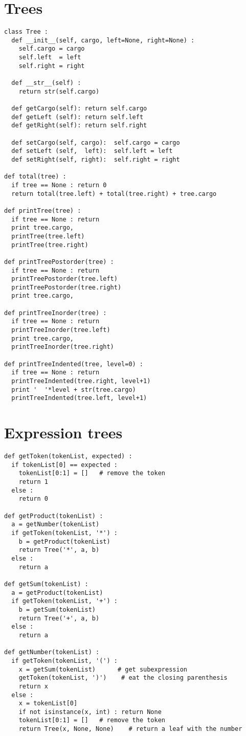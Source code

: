 \section{Trees}
\beforeverb
\begin{verbatim}
class Tree :
  def __init__(self, cargo, left=None, right=None) :
    self.cargo = cargo
    self.left  = left
    self.right = right

  def __str__(self) :
    return str(self.cargo)

  def getCargo(self): return self.cargo
  def getLeft (self): return self.left
  def getRight(self): return self.right

  def setCargo(self, cargo):  self.cargo = cargo
  def setLeft (self,  left):  self.left = left
  def setRight(self, right):  self.right = right

def total(tree) :
  if tree == None : return 0
  return total(tree.left) + total(tree.right) + tree.cargo

def printTree(tree) :
  if tree == None : return
  print tree.cargo,
  printTree(tree.left)
  printTree(tree.right)

def printTreePostorder(tree) :
  if tree == None : return
  printTreePostorder(tree.left)
  printTreePostorder(tree.right)
  print tree.cargo,

def printTreeInorder(tree) :
  if tree == None : return
  printTreeInorder(tree.left)
  print tree.cargo,
  printTreeInorder(tree.right)

def printTreeIndented(tree, level=0) :
  if tree == None : return
  printTreeIndented(tree.right, level+1)
  print '  '*level + str(tree.cargo)
  printTreeIndented(tree.left, level+1)
\end{verbatim}

\section{Expression trees}

\begin{verbatim}
def getToken(tokenList, expected) :
  if tokenList[0] == expected :
    tokenList[0:1] = []   # remove the token
    return 1
  else :
    return 0

def getProduct(tokenList) :
  a = getNumber(tokenList)
  if getToken(tokenList, '*') :
    b = getProduct(tokenList)
    return Tree('*', a, b)
  else :
    return a

def getSum(tokenList) :
  a = getProduct(tokenList)
  if getToken(tokenList, '+') :
    b = getSum(tokenList)
    return Tree('+', a, b)
  else :
    return a

def getNumber(tokenList) :
  if getToken(tokenList, '(') :
    x = getSum(tokenList)      # get subexpression
    getToken(tokenList, ')')    # eat the closing parenthesis
    return x
  else :
    x = tokenList[0]
    if not isinstance(x, int) : return None
    tokenList[0:1] = []   # remove the token
    return Tree(x, None, None)    # return a leaf with the number
\end{verbatim}


